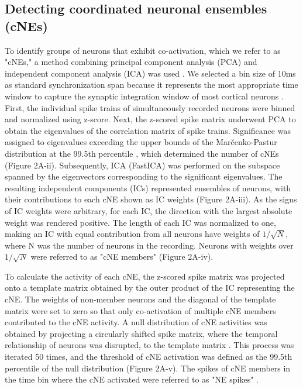 \documentclass[11pt]{article}
\begin{document}
\subsection*{Detecting coordinated neuronal ensembles (cNEs)}
To identify groups of neurons that exhibit co-activation, which we refer to as "cNEs," a method combining principal component analysis (PCA) and independent component analysis (ICA) was used \citep{Lopes-dos-Santos2013, See2018}. We selected a bin size of 10ms as standard  synchronization span because it represents the most appropriate time window to capture the synaptic integration window of most cortical neurons \citep{leger2005synaptic, d2015inhibitory}. First, the individual spike trains of simultaneously recorded neurons were binned and normalized using z-score. Next, the z-scored spike matrix underwent PCA to obtain the eigenvalues of the correlation matrix of spike trains. Significance was assigned to eigenvalues exceeding the upper bounds of the Marčenko-Pastur distribution at the 99.5th percentile \citep{Marcenko1967}, which determined the number of cNEs (Figure 2A-ii). Subsequently, ICA (FastICA) was performed on the subspace spanned by the eigenvectors corresponding to the significant eigenvalues. The resulting independent components (ICs) represented ensembles of neurons, with their contributions to each cNE shown as IC weights (Figure 2A-iii). As the signs of IC weights were arbitrary, for each IC, the direction with the largest absolute weight was rendered positive. The length of each IC was normalized to one, making an IC with equal contribution from all neurons have weights of $1/\sqrt{N}$, where N was the number of neurons in the recording. Neurons with weights over $1/\sqrt{N}$ were referred to as "cNE members" \citep{Oberto2021} (Figure 2A-iv).

To calculate the activity of each cNE, the z-scored spike matrix was projected onto a template matrix obtained by the outer product of the IC representing the cNE. The weights of non-member neurons and the diagonal of the template matrix were set to zero so that only co-activation of multiple cNE members contributed to the cNE activity. A null distribution of cNE activities was obtained by projecting a circularly shifted spike matrix, where the temporal relationship of neurons was disrupted, to the template matrix \citep{See2018}. This process was iterated 50 times, and the threshold of cNE activation was defined as the 99.5th percentile of the null distribution (Figure 2A-v). The spikes of cNE members in the time bin where the cNE activated were referred to as "NE spikes" \citep{See2021, Oberto2021}.
\end{document}
